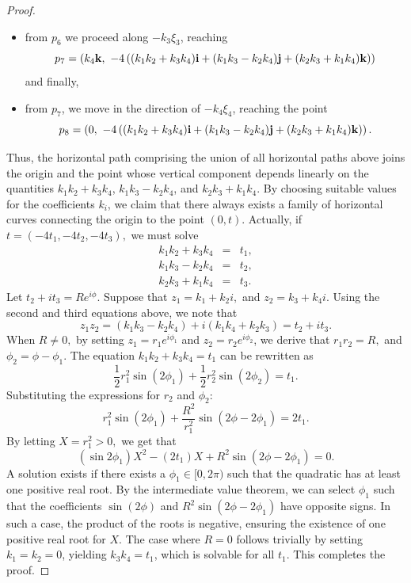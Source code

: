 \documentclass [12pt,a4paper]{amsart}
\newcommand{\bi}{{\bf i}}
\newcommand{\bj}{{\bf j}}
\newcommand{\bk}{{\bf k}}
\theoremstyle{plain}
\theoremstyle{definition}
\numberwithin{equation}{section}
\begin{document}
\begin{proof}
\begin{itemize}
$$
p_6 = \left(k_3 \bj + k_4 \bk,\ -2\left((2k_1 k_2 + k_3 k_4) \bi + (2k_1 k_3 - 2k_2 k_4) \bj + (2k_2 k_3 + 2k_1 k_4) \bk\right) \right);
$$
\item
from $p_6$ we proceed along $ -k_3 \xi_3 $, reaching  
$$
p_7 = \left(k_4 \bk,\ -4\left((k_1 k_2 + k_3 k_4) \bi + (k_1 k_3 - k_2 k_4) \bj + (k_2 k_3 + k_1 k_4) \bk\right) \right)
$$
and finally,
\item from $p_7$, we move in the direction of $ -k_4 \xi_4 $, reaching the point  
$$
p_8 = \left(0,\ -4\left((k_1 k_2 + k_3 k_4) \bi + (k_1 k_3 - k_2 k_4) \bj + (k_2 k_3 + k_1 k_4) \bk\right) \right).
$$
\end{itemize}
Thus, the horizontal path comprising the union of all horizontal paths above joins the origin and the point whose vertical component depends linearly on the quantities $k_1 k_2 + k_3 k_4 $, $ k_1 k_3 - k_2 k_4 $, and $ k_2 k_3 + k_1 k_4 $. By choosing suitable values 
for the coefficients $k_i$, we claim that there always exists a family of horizontal curves connecting the origin to the point $(0, t)$. Actually, if $t=(-4t_1, -4t_2, -4t_3),$ we must solve
\begin{eqnarray*}
k_1 k_2 + k_3 k_4&=&t_1,\\
k_1 k_3 - k_2 k_4&=&t_2,\\
k_2 k_3 + k_1 k_4 &=&t_3.
\end{eqnarray*}
Let $t_2 + i t_3 = R e^{i\phi}.$ Suppose that $z_1 =k_1 + k_2 i,$ and $z_2 = k_3 + k_4i$. Using the second and third equations above, we note that
$$z_1 z_2 = (k_1k_3 - k_2k_4) + i(k_1k_4 + k_2k_3) = t_2 + i t_3.$$
When $R\neq0,$ by setting $z_1 = r_1 e^{i\phi_1}$ and $z_2 = r_2 e^{i\phi_2}$, we derive that $r_1 r_2 = R,$ and $\phi_2 = \phi - \phi_1.$ 
The equation $k_1k_2 + k_3k_4 = t_1$ can be rewritten as 
$$\frac{1}{2} r_1^2 \sin(2\phi_1) + \frac{1}{2} r_2^2 \sin(2\phi_2) = t_1.$$
Substituting the expressions for $r_2$ and $\phi_2$:
$$r_1^2 \sin(2\phi_1) + \frac{R^2}{r_1^2} \sin(2\phi- 2\phi_1) = 2t_1.$$
By letting $X = r_1^2 > 0,$ we get that
$$(\sin 2\phi_1) X^2 - (2t_1) X + R^2 \sin(2\phi - 2\phi_1) = 0.$$
A solution exists if there exists a $\phi_1 \in [0, 2\pi)$ such that the quadratic has at least one positive real root. By the intermediate value theorem, we can select $\phi_1$ such that the coefficients $\sin(2\phi)$ and $R^2 \sin(2\phi - 2\phi_1)$ have opposite signs. In such a case, the product of the roots is negative, ensuring the existence of one positive real root for $X$.
The case where $R=0$ follows trivially by setting $k_1=k_2=0$, yielding $k_3k_4=t_1$, which is solvable for all $t_1$.
 This completes the proof.
\end{proof}
\end{document}
